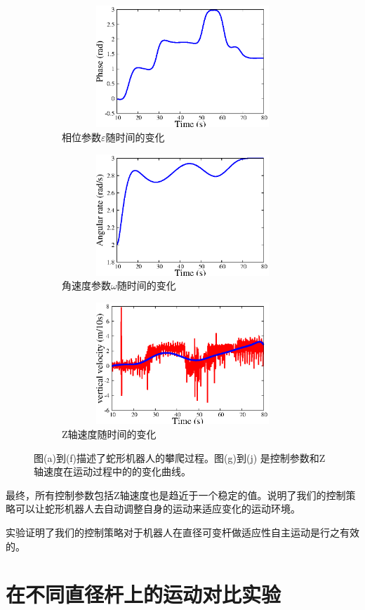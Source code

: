 \begin{figure}[htbp]
\begin{subfigure}{0.45\textwidth}{
			\centering
			\includegraphics[width=1\textwidth,height=130pt]{figure/chap05/BSB/p.eps}
			\caption{相位参数$\varepsilon$随时间的变化}
			\label{fig:bsp}
		}
	\end{subfigure}
	\begin{subfigure}{0.45\textwidth}{
			\centering
			\includegraphics[width=1\textwidth,height=130pt]{figure/chap05/BSB/w.eps}
			\caption{角速度参数$\omega$随时间的变化}
			\label{fig:bsw}
		}
	\end{subfigure}
	\begin{subfigure}{0.45\textwidth}{
			\centering
			\includegraphics[width=1\textwidth,height=130pt]{figure/chap05/BSB/v}
			\caption{Z轴速度随时间的变化}
			\label{fig:bsv}
		}
	\end{subfigure}
	\caption{图(a)到(f)描述了蛇形机器人的攀爬过程。图(g)到(j) 是控制参数和Z轴速度在运动过程中的的变化曲线。}
	\label{fig:BSB}
\end{figure}


最终，所有控制参数包括Z轴速度也是趋近于一个稳定的值。说明了我们的控制策略可以让蛇形机器人去自动调整自身的运动来适应变化的运动环境。

实验证明了我们的控制策略对于机器人在直径可变杆做适应性自主运动是行之有效的。


\section{在不同直径杆上的运动对比实验}

